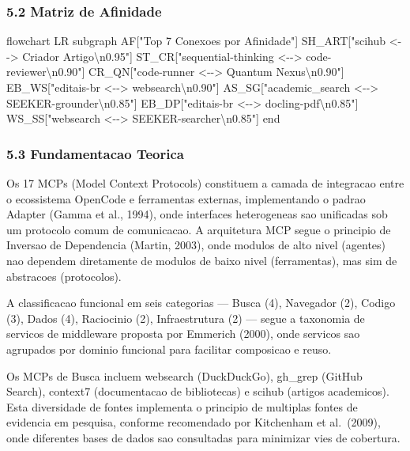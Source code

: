 \documentclass[
  12pt,
]{article}
\newenvironment{Shaded}{}{}
\newcommand{\NormalTok}[1]{#1}
\begin{document}
\subsubsection{5.2 Matriz de Afinidade}\label{matriz-de-afinidade}

\begin{Shaded}
\begin{Highlighting}[]
\NormalTok{flowchart LR}
\NormalTok{subgraph AF["Top 7 Conexoes por Afinidade"]}
\NormalTok{SH\_ART["scihub \textless{}{-}{-}\textgreater{} Criador Artigo\textbackslash{}n0.95"]}
\NormalTok{ST\_CR["sequential{-}thinking \textless{}{-}{-}\textgreater{} code{-}reviewer\textbackslash{}n0.90"]}
\NormalTok{CR\_QN["code{-}runner \textless{}{-}{-}\textgreater{} Quantum Nexus\textbackslash{}n0.90"]}
\NormalTok{EB\_WS["editais{-}br \textless{}{-}{-}\textgreater{} websearch\textbackslash{}n0.90"]}
\NormalTok{AS\_SG["academic\_search \textless{}{-}{-}\textgreater{} SEEKER{-}grounder\textbackslash{}n0.85"]}
\NormalTok{EB\_DP["editais{-}br \textless{}{-}{-}\textgreater{} docling{-}pdf\textbackslash{}n0.85"]}
\NormalTok{WS\_SS["websearch \textless{}{-}{-}\textgreater{} SEEKER{-}searcher\textbackslash{}n0.85"]}
\NormalTok{end}
\end{Highlighting}
\end{Shaded}

\subsubsection{5.3 Fundamentacao Teorica}\label{fundamentacao-teorica-4}

Os 17 MCPs (Model Context Protocols) constituem a camada de integracao
entre o ecossistema OpenCode e ferramentas externas, implementando o
padrao Adapter (Gamma et al., 1994), onde interfaces heterogeneas sao
unificadas sob um protocolo comum de comunicacao. A arquitetura MCP
segue o principio de Inversao de Dependencia (Martin, 2003), onde
modulos de alto nivel (agentes) nao dependem diretamente de modulos de
baixo nivel (ferramentas), mas sim de abstracoes (protocolos).

A classificacao funcional em seis categorias --- Busca (4), Navegador
(2), Codigo (3), Dados (4), Raciocinio (2), Infraestrutura (2) --- segue
a taxonomia de servicos de middleware proposta por Emmerich (2000), onde
servicos sao agrupados por dominio funcional para facilitar composicao e
reuso.

Os MCPs de Busca incluem websearch (DuckDuckGo), gh\_grep (GitHub
Search), context7 (documentacao de bibliotecas) e scihub (artigos
academicos). Esta diversidade de fontes implementa o principio de
multiplas fontes de evidencia em pesquisa, conforme recomendado por
Kitchenham et al.~(2009), onde diferentes bases de dados sao consultadas
para minimizar vies de cobertura.
\end{document}

